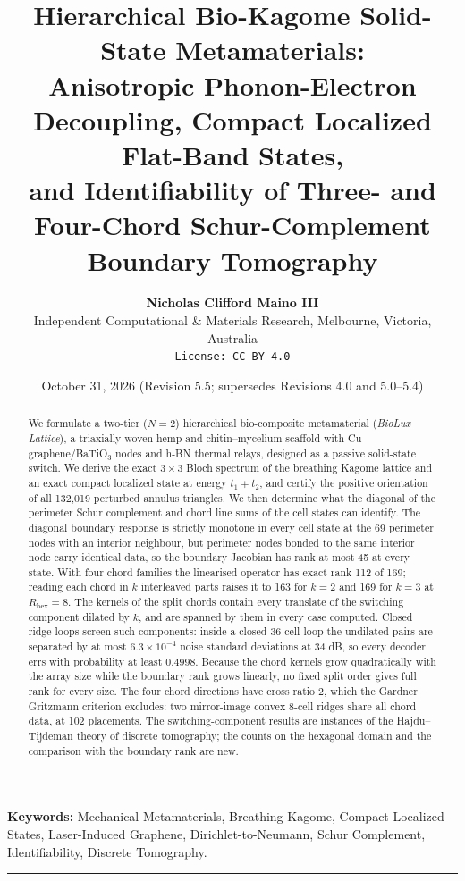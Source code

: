 \documentclass[11pt,a4paper]{article}
\title{\textbf{Hierarchical Bio-Kagome Solid-State Metamaterials:\\
Anisotropic Phonon-Electron Decoupling, Compact Localized Flat-Band States,\\
and Identifiability of Three- and Four-Chord Schur-Complement Boundary Tomography}}
\author{\textbf{Nicholas Clifford Maino III}\\
Independent Computational \& Materials Research, Melbourne, Victoria, Australia\\
\texttt{License: CC-BY-4.0}}
\date{October 31, 2026 (Revision 5.5; supersedes Revisions 4.0 and 5.0--5.4)}
\theoremstyle{definition}
\theoremstyle{remark}
\begin{document}
\maketitle

\begin{abstract}
\noindent We formulate a two-tier ($N=2$) hierarchical bio-composite metamaterial (\textit{BioLux Lattice}), a triaxially woven hemp and chitin--mycelium scaffold with Cu-graphene/BaTiO$_3$ nodes and h-BN thermal relays, designed as a passive solid-state switch. We derive the exact $3\times3$ Bloch spectrum of the breathing Kagome lattice and an exact compact localized state at energy $t_1+t_2$, and certify the positive orientation of all 132{,}019 perturbed annulus triangles. We then determine what the diagonal of the perimeter Schur complement and chord line sums of the cell states can identify. The diagonal boundary response is strictly monotone in every cell state at the 69 perimeter nodes with an interior neighbour, but perimeter nodes bonded to the same interior node carry identical data, so the boundary Jacobian has rank at most 45 at every state. With four chord families the linearised operator has exact rank 112 of 169; reading each chord in $k$ interleaved parts raises it to 163 for $k=2$ and 169 for $k=3$ at $R_{\text{hex}} = 8$. The kernels of the split chords contain every translate of the switching component dilated by $k$, and are spanned by them in every case computed. Closed ridge loops screen such components: inside a closed 36-cell loop the undilated pairs are separated by at most $6.3\times10^{-4}$ noise standard deviations at 34 dB, so every decoder errs with probability at least 0.4998. Because the chord kernels grow quadratically with the array size while the boundary rank grows linearly, no fixed split order gives full rank for every size. The four chord directions have cross ratio 2, which the Gardner--Gritzmann criterion excludes: two mirror-image convex 8-cell ridges share all chord data, at 102 placements. The switching-component results are instances of the Hajdu--Tijdeman theory of discrete tomography; the counts on the hexagonal domain and the comparison with the boundary rank are new.
\end{abstract}

\noindent \textbf{Keywords:} Mechanical Metamaterials, Breathing Kagome, Compact Localized States, Laser-Induced Graphene, Dirichlet-to-Neumann, Schur Complement, Identifiability, Discrete Tomography.

\vspace{0.5em}\hrule\vspace{0.5em}
\end{document}
